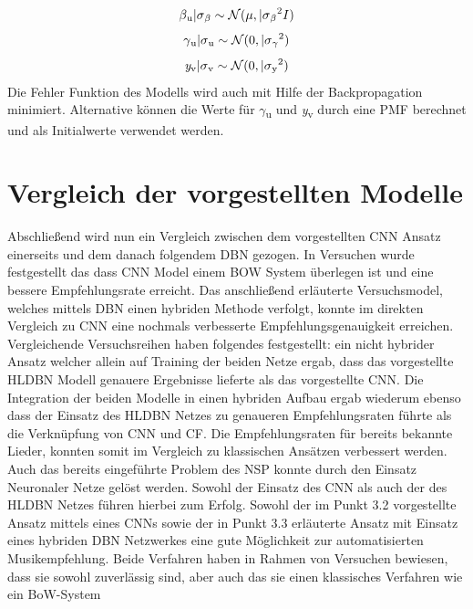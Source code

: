 \documentclass[twosided,a4,10pt]{article}
\begin{document}
\begin{multicols}{2}
\begin{equation*}
		\centering
		\beta\textsubscript{u}|\sigma\textsubscript{$\beta$}\sim\mathcal{N}(\mu,|\sigma\textsubscript{$\beta$}\textsuperscript{2}I)
		\end{equation*}
		\begin{equation*}
		\centering
		\gamma\textsubscript{u}|\sigma\textsubscript{u}\sim\mathcal{N}(0,|\sigma\textsubscript{$\gamma$}\textsuperscript{2})
		\end{equation*}
		\begin{equation*}
		\centering
		\textit{y}\textsubscript{v}|\sigma\textsubscript{v}\sim\mathcal{N}(0,|\sigma\textsubscript{y}\textsuperscript{2})
		\end{equation*}\newline
		Die Fehler Funktion des Modells wird auch mit Hilfe der Backpropagation minimiert. Alternative können  die Werte für $\gamma$\textsubscript{u} und \textit{y}\textsubscript{v} durch eine PMF berechnet und als Initialwerte verwendet werden. \cite{wang}
		\section{Vergleich der vorgestellten Modelle}
		Abschließend wird nun ein Vergleich zwischen dem vorgestellten CNN Ansatz einerseits und dem danach folgendem DBN gezogen. In Versuchen \cite{oord} wurde festgestellt das dass CNN Model einem BOW System überlegen ist und eine bessere Empfehlungsrate erreicht. Das anschließend erläuterte  Versuchsmodel, welches mittels DBN einen hybriden Methode verfolgt, konnte im direkten Vergleich zu CNN eine nochmals verbesserte Empfehlungsgenauigkeit erreichen. Vergleichende Versuchsreihen \cite{wang} haben folgendes festgestellt: ein nicht hybrider Ansatz welcher allein auf Training der beiden Netze ergab, dass das vorgestellte HLDBN Modell genauere Ergebnisse lieferte als das vorgestellte CNN. Die Integration der beiden Modelle in einen hybriden Aufbau ergab wiederum ebenso dass der Einsatz des HLDBN Netzes zu genaueren Empfehlungsraten führte als die Verknüpfung von CNN und CF. Die Empfehlungsraten für bereits bekannte Lieder, konnten somit im Vergleich zu klassischen Ansätzen verbessert werden. Auch das bereits eingeführte Problem des NSP konnte durch den Einsatz Neuronaler Netze gelöst werden.  Sowohl der Einsatz des CNN als auch der des HLDBN Netzes führen hierbei zum Erfolg.
		Sowohl der im Punkt 3.2 vorgestellte Ansatz mittels eines CNNs sowie der in Punkt 3.3 erläuterte Ansatz mit Einsatz eines hybriden DBN Netzwerkes eine gute Möglichkeit zur automatisierten Musikempfehlung. Beide Verfahren haben in Rahmen von Versuchen bewiesen, dass sie sowohl zuverlässig sind, aber auch das sie einen klassisches Verfahren wie ein BoW-System 
		
		
	\end{multicols}
\end{document}
